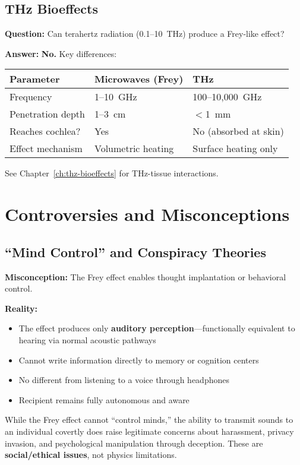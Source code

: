 \subsection{THz Bioeffects}

\textbf{Question:} Can terahertz radiation (0.1--10~THz) produce a Frey-like effect?

\textbf{Answer:} \textbf{No.} Key differences:

\begin{center}
\begin{tabular}{@{}lll@{}}
\toprule
\textbf{Parameter} & \textbf{Microwaves (Frey)} & \textbf{THz} \\
\midrule
Frequency & 1--10~GHz & 100--10,000~GHz \\
Penetration depth & 1--3~cm & $<$1~mm \\
Reaches cochlea? & Yes & No (absorbed at skin) \\
Effect mechanism & Volumetric heating & Surface heating only \\
\bottomrule
\end{tabular}
\end{center}

See Chapter~\ref{ch:thz-bioeffects} for THz-tissue interactions.

\section{Controversies and Misconceptions}

\subsection{``Mind Control'' and Conspiracy Theories}

\textbf{Misconception:} The Frey effect enables thought implantation or behavioral control.

\textbf{Reality:}
\begin{itemize}
\item The effect produces only \textbf{auditory perception}---functionally equivalent to hearing via normal acoustic pathways
\item Cannot write information directly to memory or cognition centers
\item No different from listening to a voice through headphones
\item Recipient remains fully autonomous and aware
\end{itemize}

\begin{warningbox}
While the Frey effect cannot ``control minds,'' the ability to transmit sounds to an individual covertly does raise legitimate concerns about harassment, privacy invasion, and psychological manipulation through deception. These are \textbf{social/ethical issues}, not physics limitations.
\end{warningbox}


